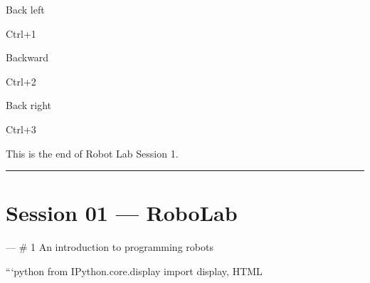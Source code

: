 \documentclass[letterpaper,10pt,english]{sphinxmanual}
\begin{document}

Back left

Ctrl+1






Backward

Ctrl+2






Back right

Ctrl+3









This is the end of Robot Lab Session 1.


\bigskip\hrule\bigskip



\section{Session 01 — RoboLab}
\label{\detokenize{index:session-01-robolab}}


---
# 1 An introduction to programming robots

```python
from IPython.core.display import display, HTML
\end{document}
